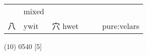 \documentclass[14pt,a4paper]{scrartcl}
\begin{document}
\begin{longtable}[c]{@{}llllll@{}}
\begin{minipage}[t]{0.14\columnwidth}\raggedright\strut
\strut\end{minipage} &
\begin{minipage}[t]{0.14\columnwidth}\raggedright\strut
mixed
\strut\end{minipage}\tabularnewline
\begin{minipage}[t]{0.14\columnwidth}\raggedright\strut
八
\strut\end{minipage} &
\begin{minipage}[t]{0.14\columnwidth}\raggedright\strut
ywit
\strut\end{minipage} &
\begin{minipage}[t]{0.14\columnwidth}\raggedright\strut
穴 hwet
\strut\end{minipage} &
\begin{minipage}[t]{0.14\columnwidth}\raggedright\strut
\strut\end{minipage} &
\begin{minipage}[t]{0.14\columnwidth}\raggedright\strut
\strut\end{minipage} &
\begin{minipage}[t]{0.14\columnwidth}\raggedright\strut
pure:velars
\strut\end{minipage}\tabularnewline
\bottomrule
\end{longtable}

(10) 0540 {[}5{]}
\end{document}
